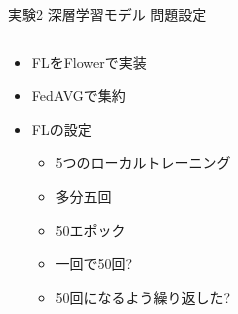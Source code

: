 \documentclass[unicode,12pt,aspectratio=169, dvipdfmx]{beamer}
\begin{document}
    \begin{frame}{実験2 深層学習モデル 問題設定}
        \begin{columns}
            \begin{column}[T]{.6\linewidth}
                \begin{itemize}
                    \item FLをFlowerで実装
                    \item FedAVGで集約
                    \item FLの設定
                    \begin{itemize}
                        \item 5つのローカルトレーニング
                        \item 多分五回
                        \item 50エポック
                        \item 一回で50回?
                        \item 50回になるよう繰り返した?
                    \end{itemize}
                \end{itemize}    
            \end{column}
            \begin{column}[T]{.5\linewidth}
                \begin{center}
                \end{center}
                \end{column}
        \end{columns}
    \end{frame}
\end{document}
